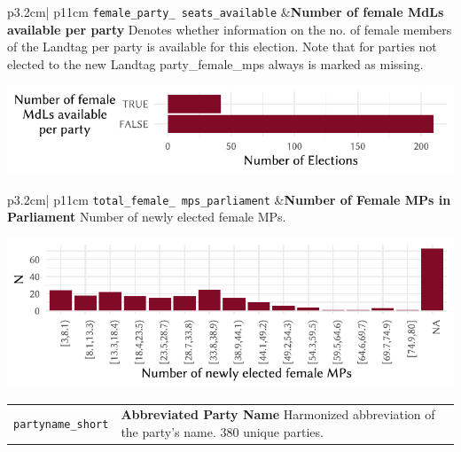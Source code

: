 \documentclass[
]{scrartcl}
\begin{document}
\begin{longtable}{p{3.2cm}| p{11cm}}
\texttt{female\_party\_
seats\_available} &\textbf{Number of female MdLs available per party}\newline 
Denotes whether information on the no. of female members of the Landtag per party is available for this election. Note that for parties not elected to the new Landtag party\_female\_mps always is marked as missing.

\hspace*{.25cm}
\begin{minipage}[t]{\linewidth }
\vspace{0pt}
\includegraphics[width = \linewidth]{cbfiles/fpsaplot.pdf}
\end{minipage}


\end{longtable}

\begin{longtable}{p{3.2cm}| p{11cm}}
\texttt{total\_female\_
mps\_parliament} &\textbf{Number of Female MPs in Parliament}\newline 
Number of newly elected female MPs.

\hspace*{.25cm}
\begin{minipage}[t]{\linewidth }
\vspace{0pt}
\includegraphics[width = \linewidth]{cbfiles/totfemmpsplot.pdf}
\end{minipage}


\end{longtable}

\begin{longtable}{p{3.2cm}| p{11cm}}
\texttt{partyname\_short} &\textbf{Abbreviated Party Name}\newline 
Harmonized abbreviation of the party's name. 380 unique parties.
\end{longtable}
\end{document}

